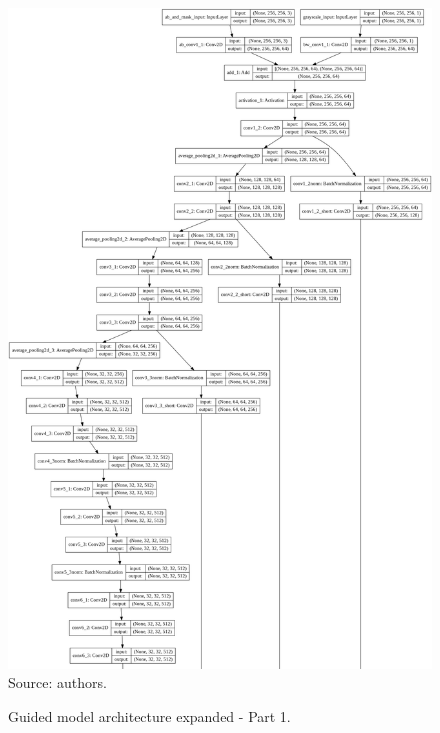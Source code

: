 \documentclass[12pt,openright,oneside,a4paper,english, brazilian]{abntex2}
\begin{document}
\begin{otherlanguage}{english}
\begin{figure}[!htb]
\centering
\caption{Guided model architecture expanded - Part 1.}
\includegraphics[height = \textheight - 1.5cm]{model_plot/Guided1}
Source: authors.
\label{guided_plot_1}
\end{figure}


\end{otherlanguage}
\end{document}
